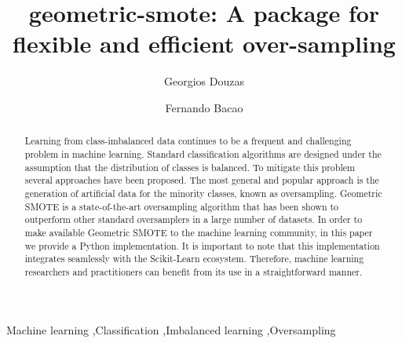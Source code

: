 \documentclass[preprint,12pt, a4paper]{elsarticle}
\begin{document}
\begin{frontmatter}

\title{geometric-smote: A package for flexible and efficient over-sampling}

\author{Georgios Douzas}

\author{Fernando Bacao}

\address{NOVA Information Management School, Universidade Nova de Lisboa}


\begin{abstract}
	Learning from class-imbalanced data continues to be a frequent and challenging problem in machine learning. Standard classification algorithms are designed under the assumption that the distribution of classes is balanced. To mitigate this problem several approaches have been proposed. The most general and popular approach is the generation of artificial data for the minority classes, known as oversampling. Geometric SMOTE is a state-of-the-art oversampling algorithm that has been shown to outperform other standard oversamplers in a large number of datasets. In order to make available Geometric SMOTE to the machine learning community, in this paper we provide a Python implementation. It is important to note that this implementation integrates seamlessly with the Scikit-Learn ecosystem. Therefore, machine learning researchers and practitioners can benefit from its use in a straightforward manner.
\end{abstract}

\begin{keyword}
Machine learning \sep Classification \sep Imbalanced learning \sep Oversampling
\end{keyword}

\end{frontmatter}
\end{document}
